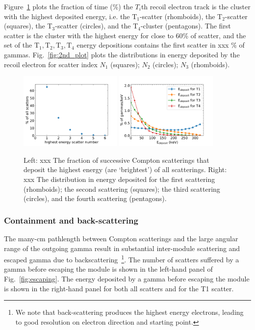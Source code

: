 \documentclass[12pt]{article}
\begin{document}
Figure~\ref{fig:true_vs_reconstructed} plots the fraction of time (\%) the $T_i$th
recoil electron track is the cluster with the highest deposited energy,
i.e. the T$_1$-scatter (rhomboids), the T$_2$-scatter (squares),
the T$_3$-scatter (circles), and the T$_4$-cluster (pentagons). The first scatter is the cluster with
the highest energy for close to 60\% of scatter, and the set of the
$\mathrm{T}_1,\mathrm{T}_2,\mathrm{T}_3,\mathrm{T}_4$ energy depositions contains the first scatter in
xxx \% of gammas. Fig.~\ref{fig:2nd_plot} plots the distributions in
energy deposited by the recoil electron for scatter index $N_1$
(squares); $N_2$ (circles); $N_3$ (rhomboids).

\begin{figure}[!ht]
\centering
  \includegraphics[width=0.45\textwidth]{Figures/scatter_with_highest_energy_v2.png}
  \hfil
  \includegraphics[width=0.45\textwidth]{Figures/T_eng_errorbar_v2.png}
\caption{Left: xxx The fraction of successive Compton scatterings that deposit the highest energy (are `brightest') of all scatterings.  Right: xxx The distribution in energy deposited for the first scattering (rhomboids); the second scattering (squares); the third scattering (circles), and the fourth scattering (pentagons).}
\label{fig:true_vs_reconstructed}
\end{figure}

\subsubsection{Containment and back-scattering}
The many-cm pathlength between Compton scatterings and the large angular range of the
outgoing gamma result in substantial inter-module scattering and escaped gamma due to
backscattering~\footnote{We note that back-scattering produces the highest energy electrons,
leading to good resolution on electron direction and starting point.}.
The number of scatters suffered by a gamma before escaping the module
is shown in the left-hand panel of Fig.~\ref{fig:escaping}. The energy deposited by a gamma
before escaping the module is shown in the right-hand panel for both all
scatters and for the T1 scatter.
\end{document}
